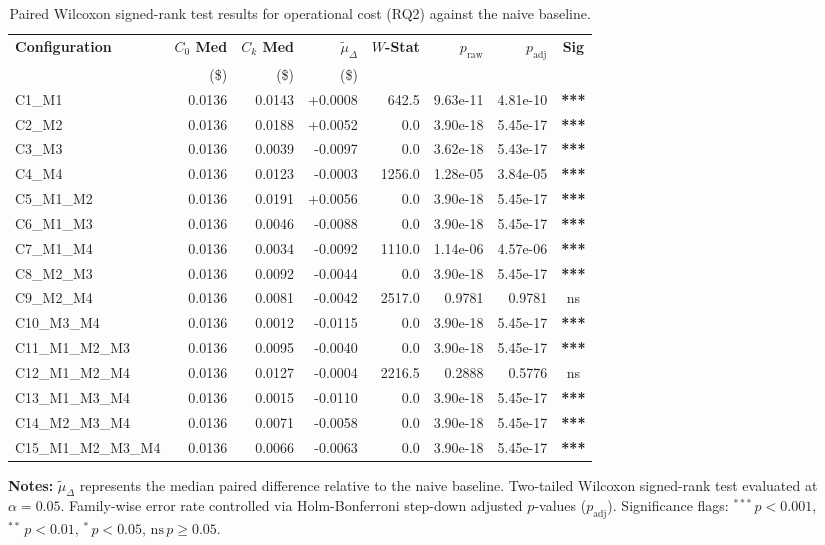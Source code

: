 \begin{table}[!htbp]
\centering
\small
\caption{Paired Wilcoxon signed-rank test results for operational cost (RQ2) against the naive baseline.}
\label{tab:wilcoxon_rq2}
\begin{tabular*}{\textwidth}{@{\extracolsep{\fill}} l r r r r r r c @{}}
\toprule
\textbf{Configuration} & \textbf{$C_0$ Med} & \textbf{$C_k$ Med} & \textbf{$\tilde{\mu}_\Delta$} & \textbf{$W$-Stat} & \textbf{$p_{\text{raw}}$} & \textbf{$p_{\text{adj}}$} & \textbf{Sig} \\
 & \scriptsize{(\$)} & \scriptsize{(\$)} & \scriptsize{(\$)} & & & & \\
\midrule
C1\_M1 & 0.0136 & 0.0143 & +0.0008 & 642.5 & 9.63e-11 & 4.81e-10 & \textbf{***} \\
C2\_M2 & 0.0136 & 0.0188 & +0.0052 & 0.0 & 3.90e-18 & 5.45e-17 & \textbf{***} \\
C3\_M3 & 0.0136 & 0.0039 & -0.0097 & 0.0 & 3.62e-18 & 5.43e-17 & \textbf{***} \\
C4\_M4 & 0.0136 & 0.0123 & -0.0003 & 1256.0 & 1.28e-05 & 3.84e-05 & \textbf{***} \\
C5\_M1\_M2 & 0.0136 & 0.0191 & +0.0056 & 0.0 & 3.90e-18 & 5.45e-17 & \textbf{***} \\
C6\_M1\_M3 & 0.0136 & 0.0046 & -0.0088 & 0.0 & 3.90e-18 & 5.45e-17 & \textbf{***} \\
C7\_M1\_M4 & 0.0136 & 0.0034 & -0.0092 & 1110.0 & 1.14e-06 & 4.57e-06 & \textbf{***} \\
C8\_M2\_M3 & 0.0136 & 0.0092 & -0.0044 & 0.0 & 3.90e-18 & 5.45e-17 & \textbf{***} \\
C9\_M2\_M4 & 0.0136 & 0.0081 & -0.0042 & 2517.0 & 0.9781 & 0.9781 & ns \\
C10\_M3\_M4 & 0.0136 & 0.0012 & -0.0115 & 0.0 & 3.90e-18 & 5.45e-17 & \textbf{***} \\
C11\_M1\_M2\_M3 & 0.0136 & 0.0095 & -0.0040 & 0.0 & 3.90e-18 & 5.45e-17 & \textbf{***} \\
C12\_M1\_M2\_M4 & 0.0136 & 0.0127 & -0.0004 & 2216.5 & 0.2888 & 0.5776 & ns \\
C13\_M1\_M3\_M4 & 0.0136 & 0.0015 & -0.0110 & 0.0 & 3.90e-18 & 5.45e-17 & \textbf{***} \\
C14\_M2\_M3\_M4 & 0.0136 & 0.0071 & -0.0058 & 0.0 & 3.90e-18 & 5.45e-17 & \textbf{***} \\
C15\_M1\_M2\_M3\_M4 & 0.0136 & 0.0066 & -0.0063 & 0.0 & 3.90e-18 & 5.45e-17 & \textbf{***} \\
\bottomrule
\end{tabular*}
\vspace{0.5em}
\parbox{\textwidth}{\footnotesize
\textbf{Notes:} $\tilde{\mu}_\Delta$ represents the median paired difference relative to the naive baseline. Two-tailed Wilcoxon signed-rank test evaluated at $\alpha = 0.05$. Family-wise error rate controlled via Holm-Bonferroni step-down adjusted $p$-values ($p_{\text{adj}}$). Significance flags: $^{***}\,p < 0.001$, $^{**}\,p < 0.01$, $^{*}\,p < 0.05$, $\text{ns}\,p \ge 0.05$.}
\end{table}
